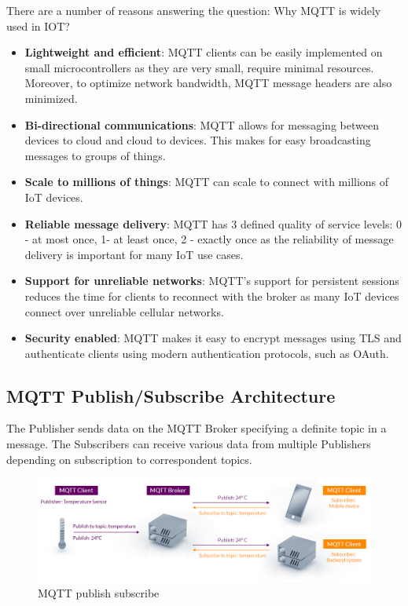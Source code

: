 \documentclass[\main/main.tex]{subfiles}
\begin{document}
There are a number of reasons answering the question: Why MQTT is widely used in IOT? 
\begin{itemize}
    \item \textbf{Lightweight and efficient}: MQTT clients can be easily implemented on small microcontrollers as they are very small, require minimal resources. Moreover, to optimize network bandwidth, MQTT message headers are also minimized.
    \item \textbf{Bi-directional communications}: MQTT allows for messaging between devices to cloud and cloud to devices. This makes for easy broadcasting messages to groups of things.
    \item \textbf{Scale to millions of things}: MQTT can scale to connect with millions of IoT devices.
    \item \textbf{Reliable message delivery}: MQTT has 3 defined quality of service levels: 0 - at most once, 1- at least once, 2 - exactly once as the reliability of message delivery is important for many IoT use cases.
    \item \textbf{Support for unreliable networks}: MQTT's support for persistent sessions reduces the time for clients to reconnect with the broker as many IoT devices connect over unreliable cellular networks. 
    \item \textbf{Security enabled}: MQTT makes it easy to encrypt messages using TLS and authenticate clients using modern authentication protocols, such as OAuth.
\end{itemize}

\subsection{MQTT Publish/Subscribe Architecture}
The Publisher sends data on the MQTT Broker specifying a definite topic in a message. The Subscribers can receive various data from multiple Publishers depending on subscription to correspondent topics.
\begin{figure}[H]
    \begin{center}
        \includegraphics[scale=0.35]{mqtt-publish-subscribe.png}
    \end{center}
    \caption{MQTT publish subscribe}
    \label{fig:mqtt_publish_subscribe}
\end{figure}
\end{document}
